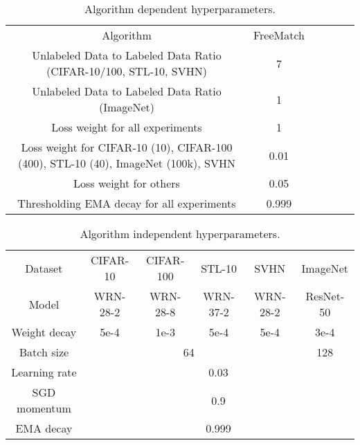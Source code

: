 \documentclass{article} \usepackage{iclr2023_conference,times}
\theoremstyle{plain}
\theoremstyle{definition}
\theoremstyle{remark}
\newcommand{\ourmethod}{FreeMatch\xspace}
\begin{document}
\begin{table}[!htbp]
\centering
\caption{Algorithm dependent hyperparameters.}
\label{tab-para-algo-depen}
\begin{adjustbox}{width=0.8\columnwidth, center}
\begin{tabular}{cccccc}
\toprule
Algorithm &  \ourmethod \\\cmidrule(r){1-1} \cmidrule(lr){2-2}
Unlabeled Data to Labeled Data Ratio (CIFAR-10/100, STL-10, SVHN)    &  7 \\
\cmidrule(r){1-1}\cmidrule(lr){2-2}
Unlabeled Data to Labeled Data Ratio (ImageNet)    &  1 \\
\cmidrule(r){1-1}\cmidrule(lr){2-2}
Loss weight  for all experiments    &  1 \\
\cmidrule(r){1-1}\cmidrule(lr){2-2}
Loss weight  for CIFAR-10 (10), CIFAR-100 (400), STL-10 (40), ImageNet (100k), SVHN   &  0.01 \\
\cmidrule(r){1-1}\cmidrule(lr){2-2}
Loss weight  for others   &  0.05 \\
\cmidrule(r){1-1}\cmidrule(lr){2-2}
Thresholding EMA decay for all experiments  & 0.999 \\
\bottomrule
\end{tabular}
\end{adjustbox}
\end{table}

\begin{table}[!htbp]
\centering
\caption{Algorithm independent hyperparameters.}
\label{tab-para-algo-inde}
\begin{adjustbox}{width=0.65\columnwidth, center}
\begin{tabular}{cccccc}\toprule
Dataset &  CIFAR-10 & CIFAR-100 & STL-10 & SVHN & ImageNet \\\cmidrule(r){1-1} \cmidrule(lr){2-2}\cmidrule(lr){3-3}\cmidrule(lr){4-4}\cmidrule(lr){5-5}\cmidrule(l){6-6}
Model    &  WRN-28-2 & WRN-28-8 & WRN-37-2 & WRN-28-2 & ResNet-50 \\\cmidrule(r){1-1} \cmidrule(lr){2-2}\cmidrule(lr){3-3}\cmidrule(lr){4-4}\cmidrule(lr){5-5}\cmidrule(l){6-6}
Weight decay&  5e-4  & 1e-3 & 5e-4 & 5e-4 & 3e-4\\ \cmidrule(r){1-1} \cmidrule(lr){2-2}\cmidrule(lr){3-3}\cmidrule(lr){4-4}\cmidrule(lr){5-5}\cmidrule(l){6-6}
Batch size & \multicolumn{4}{c}{64} & \multicolumn{1}{c}{128}\\\cmidrule(r){1-1} \cmidrule(lr){2-5} \cmidrule(l){6-6}
Learning rate & \multicolumn{5}{c}{0.03}\\\cmidrule(r){1-1} \cmidrule(l){2-6}
SGD momentum & \multicolumn{5}{c}{0.9}\\\cmidrule(r){1-1} \cmidrule(l){2-6}
EMA decay & \multicolumn{5}{c}{0.999}\\
\bottomrule
\end{tabular}
\end{adjustbox}
\end{table}
\end{document}
